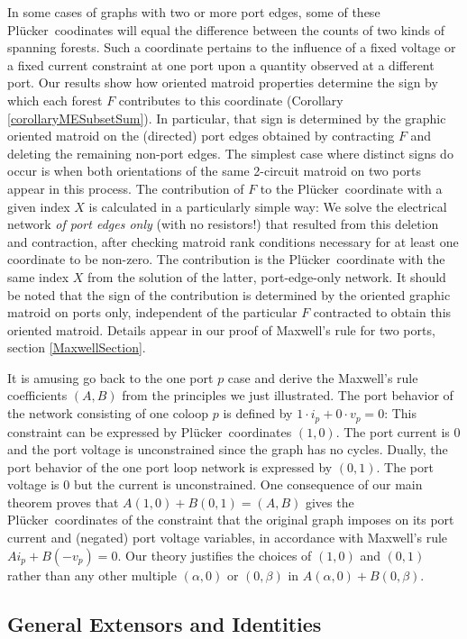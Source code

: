 \documentclass[12pt]{article}
\theoremstyle{definition}
\newcommand{\Plucker}{Pl\"{u}cker\ }
\begin{document}
In some cases of graphs with two or more port edges, some of these
\Plucker coodinates will equal the difference 
between the counts of two kinds of spanning forests.  Such a coordinate
pertains to the influence of a fixed voltage or a fixed current
constraint at one port upon a quantity observed at a different port.  
Our results show how oriented matroid properties determine the sign by which
each forest $F$ contributes to this coordinate 
(Corollary \ref{corollaryMESubsetSum}).
In particular,
that sign is determined by the graphic oriented matroid on the (directed)
port edges obtained by contracting $F$ and deleting the remaining non-port
edges.  
The simplest case where distinct signs do occur is when both orientations
of the same 2-circuit matroid on two ports appear in this process.
The contribution of $F$ to the \Plucker coordinate with 
a given index $X$ is 
calculated in a particularly simple way:  We solve the electrical network 
\textit{of port edges only} (with no resistors!)
that resulted from this deletion and contraction,
after checking matroid rank conditions necessary for at least
one coordinate to be non-zero.
The contribution is the \Plucker coordinate with the same index 
$X$ from
the solution of the latter, port-edge-only network.  
It should be noted that the sign of the contribution
is determined by the oriented graphic matroid on ports only, independent
of the particular $F$ contracted to obtain this oriented matroid.
Details appear in our proof of Maxwell's rule for two ports, section 
\ref{MaxwellSection}.

It is amusing go back to the one port $p$ case and 
derive 
the Maxwell's rule coefficients $(A,B)$ from the principles we just
illustrated.
The port behavior of the network consisting of one coloop $p$ is
defined by $1\cdot i_p + 0\cdot v_p =0$: This constraint 
can be expressed by 
\Plucker coordinates
$(1,0)$.  The port current is 0 and the port voltage is
unconstrained since the graph has no cycles.  
Dually, the port behavior of the one port loop network
is expressed by $(0,1)$.  The port voltage is 0 but the current is 
unconstrained.  One consequence of our main theorem proves that
$A(1,0)+B(0,1)=(A,B)$ gives the  
\Plucker coordinates of the constraint that the original graph
imposes on its port current and (negated) port voltage variables,
in accordance with Maxwell's rule $Ai_p + B(-v_p) = 0$.
Our theory justifies the choices of $(1,0)$ and $(0,1)$
rather than any other multiple $(\alpha,0)$ or $(0,\beta)$ in
$A(\alpha,0)+B(0,\beta)$.

\subsection{General Extensors and Identities}
\end{document}
